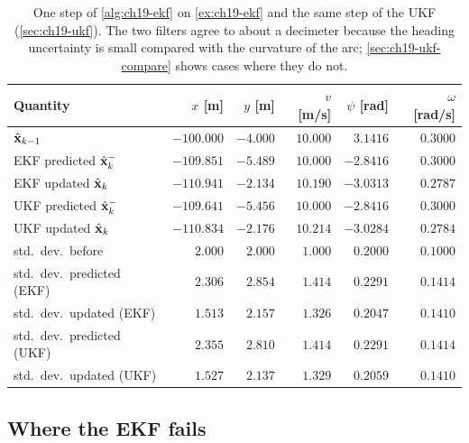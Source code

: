 \begin{table}[tb]
  \centering\small
  \caption{One step of \cref{alg:ch19-ekf} on \cref{ex:ch19-ekf} and the
  same step of the UKF (\cref{sec:ch19-ukf}). The two filters agree to about
  a decimeter because the heading uncertainty is small compared with the
  curvature of the arc; \cref{sec:ch19-ukf-compare} shows cases where they
  do not.}
  \label{tab:ch19-ekf-trace}
  \begin{tabular}{@{}lrrrrr@{}}
  \toprule
  Quantity & $x$ [m] & $y$ [m] & $v$ [m/s] & $\psi$ [rad] & $\omega$ [rad/s]\\
  \midrule
  $\hat{\mathbf{x}}_{k-1}$ & $-100.000$ & $-4.000$ & $10.000$ & $3.1416$ & $0.3000$\\
  EKF predicted $\hat{\mathbf{x}}_k^-$ & $-109.851$ & $-5.489$ & $10.000$ & $-2.8416$ & $0.3000$\\
  EKF updated $\hat{\mathbf{x}}_k$ & $-110.941$ & $-2.134$ & $10.190$ & $-3.0313$ & $0.2787$\\
  UKF predicted $\hat{\mathbf{x}}_k^-$ & $-109.641$ & $-5.456$ & $10.000$ & $-2.8416$ & $0.3000$\\
  UKF updated $\hat{\mathbf{x}}_k$ & $-110.834$ & $-2.176$ & $10.214$ & $-3.0284$ & $0.2784$\\
  \midrule
  std.\ dev.\ before & $2.000$ & $2.000$ & $1.000$ & $0.2000$ & $0.1000$\\
  std.\ dev.\ predicted (EKF) & $2.306$ & $2.854$ & $1.414$ & $0.2291$ & $0.1414$\\
  std.\ dev.\ updated (EKF) & $1.513$ & $2.157$ & $1.326$ & $0.2047$ & $0.1410$\\
  std.\ dev.\ predicted (UKF) & $2.355$ & $2.810$ & $1.414$ & $0.2291$ & $0.1414$\\
  std.\ dev.\ updated (UKF) & $1.527$ & $2.137$ & $1.329$ & $0.2059$ & $0.1410$\\
  \bottomrule
  \end{tabular}
\end{table}

\subsection{Where the EKF fails}
\label{sec:ch19-ekf-failure}


